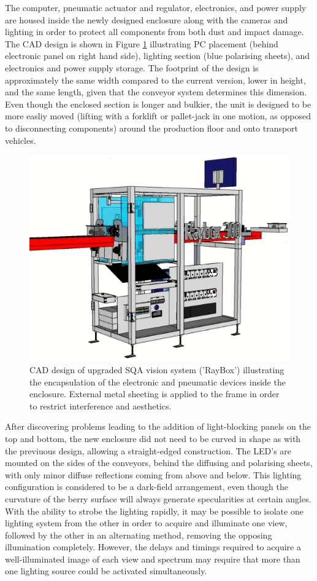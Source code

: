 \documentclass[fleqn,twoside]{article}
\begin{document}
The computer, pneumatic actuator and regulator, electronics, and power supply are housed inside the newly designed enclosure along with the cameras and lighting in order to protect all components from both dust and impact damage. The CAD design is shown in Figure \ref{fig:SQA_v2} illustrating PC placement (behind electronic panel on right hand side), lighting section (blue polarising sheets), and electronics and power supply storage. The footprint of the design is approximately the same width compared to the current version, lower in height, and the same length, given that the conveyor system determines this dimension. Even though the enclosed section is longer and bulkier, the unit is designed to be more easliy moved (lifting with a forklift or pallet-jack in one motion, as opposed to disconnecting components) around the production floor and onto transport vehicles. 


\begin{figure}[h]
	\centering
	\includegraphics[width=.8\linewidth]{SQA_v2.png}
	\caption{CAD design of upgraded SQA vision system ('RayBox') illustrating the encapsulation of the electronic and pneumatic devices inside the enclosure. External metal sheeting is applied to the frame in order to restrict interference and aesthetics.}
	\label{fig:SQA_v2}
\end{figure}%


After discovering problems leading to the addition of light-blocking panels on the top and bottom, the new enclosure did not need to be curved in shape as with the previuous design, allowing a straight-edged construction. The LED's are mounted on the sides of the conveyors, behind the diffusing and polarising sheets, with only minor diffuse reflections coming from above and below. This lighting configuration is considered to be a dark-field arrangement, even though the curvature of the berry surface will always generate specularities at certain angles. With the ability to strobe the lighting rapidly, it may be possible to isolate one lighting system from the other in order to acquire and illuminate one view, followed by the other in an alternating method, removing the opposing illumination completely. However, the delays and timings required to acquire a well-illuminated image of each view and spectrum may require that more than one lighting source could be activated simultaneously.
\end{document}
